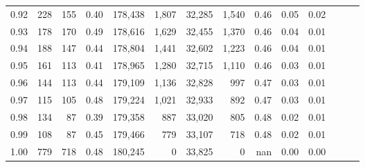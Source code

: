 \begin{tabular}{rrrrrrrrrrrrrr}
0.92 &    228 &  155 &  0.40 &  178,438 &    1,807 &  32,285 &   1,540 &  0.46 &  0.05 &      0.02 \\
0.93 &    178 &  170 &  0.49 &  178,616 &    1,629 &  32,455 &   1,370 &  0.46 &  0.04 &      0.01 \\
0.94 &    188 &  147 &  0.44 &  178,804 &    1,441 &  32,602 &   1,223 &  0.46 &  0.04 &      0.01 \\
0.95 &    161 &  113 &  0.41 &  178,965 &    1,280 &  32,715 &   1,110 &  0.46 &  0.03 &      0.01 \\
0.96 &    144 &  113 &  0.44 &  179,109 &    1,136 &  32,828 &     997 &  0.47 &  0.03 &      0.01 \\
0.97 &    115 &  105 &  0.48 &  179,224 &    1,021 &  32,933 &     892 &  0.47 &  0.03 &      0.01 \\
0.98 &    134 &   87 &  0.39 &  179,358 &      887 &  33,020 &     805 &  0.48 &  0.02 &      0.01 \\
0.99 &    108 &   87 &  0.45 &  179,466 &      779 &  33,107 &     718 &  0.48 &  0.02 &      0.01 \\
1.00 &    779 &  718 &  0.48 &  180,245 &        0 &  33,825 &       0 &   nan &  0.00 &      0.00 \\
\bottomrule
\end{tabular}
